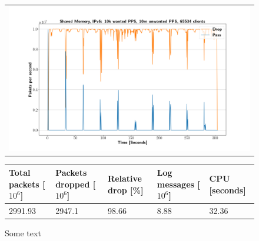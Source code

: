 \begin{figure}[!h]
	\label{fig:simplefail2ban:shm:ip6:10m}
	\centering
	\scriptsize
	\begin{tabular}{c}
    	\centerline{\includegraphics[width=1.2\textwidth]{images/simplefail2ban_shm_ipv6_v10k_iv10m_c65534.png}}
	\end{tabular}
	\begin{tabular}{lllll}
		\toprule
		\textbf{Total packets [$10^6$]} & \textbf{Packets dropped [$10^6$]} & \textbf{Relative drop [\%]} & \textbf{Log messages [$10^6$]} & \textbf{CPU [seconds]} \\ \midrule 
		2991.93 & 2947.1 & 98.66 & 8.88 & 32.36 \\
		\bottomrule
	\end{tabular}
	\caption[Simplefail2ban, Shared Memory, IPv6, 10m \ac{PPS}]{Some text}
\end{figure}

%
%
\def\UrlBreaks{\do\/\do-}
\begingroup
\sloppy


\endgroup


